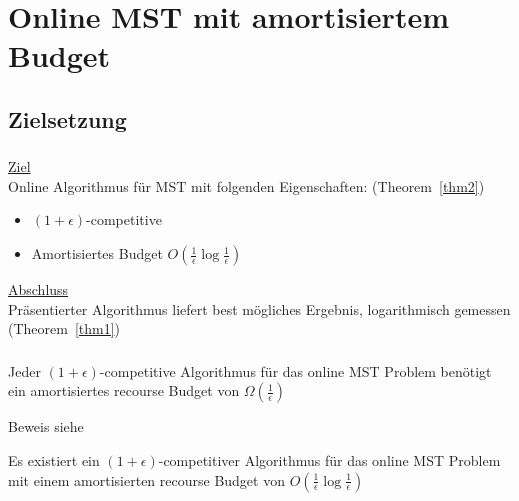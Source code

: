 \section{Online MST mit amortisiertem Budget}

\subsection{Zielsetzung}
\begin{frame}
    \frametitle{\insertsubsection}
    \underline{Ziel}\\
    \vspace{1em}
    Online Algorithmus für MST mit folgenden Eigenschaften: (Theorem~\ref{thm2})\\
    \vspace{1em}
    \begin{itemize}
        \itemsep\setlength{.8em}
        \item $(1+\epsilon)$-competitive
        \item Amortisiertes Budget $O(\frac{1}{\epsilon}\log\frac{1}{\epsilon})$
    \end{itemize}
    \vspace{1em}

    \underline{Abschluss}\\
    \vspace{1em}
    Präsentierter Algorithmus liefert best mögliches Ergebnis, logarithmisch gemessen (Theorem~\ref{thm1})
\end{frame}

\begin{frame}
    \frametitle{\insertsection}
    \begin{theorem}
        \label{thm1}
        \vspace{.5em}
        Jeder $(1+\epsilon)$-competitive Algorithmus für das online MST Problem benötigt ein amortisiertes recourse Budget von $\Omega(\frac{1}{\epsilon})$
        \vspace{1em}
    \end{theorem}
    Beweis siehe \cite{recourse2016}
    \vspace{1em}

    \begin{theorem}
        \label{thm2}
        \vspace{.5em}
        Es existiert ein $(1+\epsilon)$-competitiver Algorithmus für das online MST Problem mit einem amortisierten recourse Budget von $O(\frac{1}{\epsilon}\log\frac{1}{\epsilon})$
        \vspace{1em}
    \end{theorem}
\end{frame}

